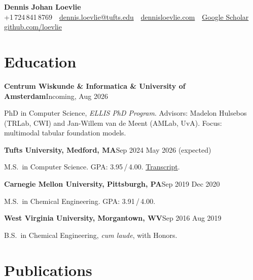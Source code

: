 \documentclass[10pt,letterpaper]{article}
\newcommand{\sansfam}{\sffamily}
\newcommand{\datestamp}[1]{{\sansfam\footnotesize\color{meta}\figureversion{lf}#1}}
\newcommand{\role}[2]{%
  \filbreak%
  \par\vspace{1pt}%
  \noindent\textbf{#1}\hfill\datestamp{#2}\par\nopagebreak}
\begin{document}
\thispagestyle{cvfirst}

\begin{center}
{\sansfam\fontsize{22pt}{26pt}\selectfont\bfseries\color{accent} Dennis Johan Loevlie}\\[2pt]
{\sansfam\footnotesize\color{meta}%
+1\,724\,841\,8769 \,\textperiodcentered\,
\href{mailto:dennis.loevlie@tufts.edu}{dennis.loevlie@tufts.edu} \,\textperiodcentered\,
\href{https://www.dennisloevlie.com}{dennisloevlie.com} \,\textperiodcentered\,
\href{https://scholar.google.com/citations?user=oGkEIYkAAAAJ}{Google Scholar} \,\textperiodcentered\,
\href{https://github.com/loevlie}{github.com/loevlie}}
\end{center}
\vspace{-4pt}{\color{rule}\rule{\linewidth}{0.5pt}}

\section{Education}

\role{Centrum Wiskunde \& Informatica \& University of Amsterdam}{Incoming, Aug 2026 \textendash{}}
PhD in Computer Science, \textit{ELLIS PhD Program}. Advisors: Madelon Hulsebos (TRLab, CWI) and Jan-Willem van de Meent (AMLab, UvA). Focus: multimodal tabular foundation models.

\role{Tufts University, Medford, MA}{Sep 2024 \textendash{} May 2026 (expected)}
M.S.\ in Computer Science. GPA: 3.95\,/\,4.00. \href{https://www.loevliedl.com/static/Portfolio/PDF/SSR_TSRPT.pdf}{Transcript}.

\role{Carnegie Mellon University, Pittsburgh, PA}{Sep 2019 \textendash{} Dec 2020}
M.S.\ in Chemical Engineering. GPA: 3.91\,/\,4.00.

\role{West Virginia University, Morgantown, WV}{Sep 2016 \textendash{} Aug 2019}
B.S.\ in Chemical Engineering, \textit{cum laude}, with Honors.

\section{Publications}
\end{document}
